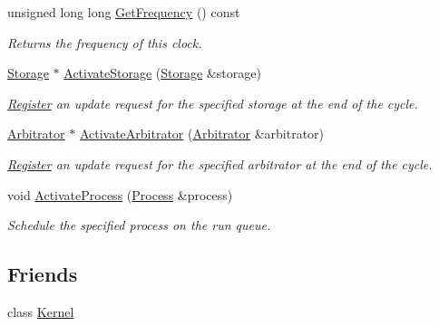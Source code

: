 \begin{DoxyCompactItemize}
unsigned long long \hyperlink{class_simulator_1_1_clock_a33bced1d6b21cfa1e13923ddb2213b07}{Get\+Frequency} () const 
\begin{DoxyCompactList}\small\item\em Returns the frequency of this clock. \end{DoxyCompactList}\item 
\hyperlink{class_simulator_1_1_storage}{Storage} $\ast$ \hyperlink{class_simulator_1_1_clock_af051b1730aa459c97e41ff514099d16f}{Activate\+Storage} (\hyperlink{class_simulator_1_1_storage}{Storage} \&storage)
\begin{DoxyCompactList}\small\item\em \hyperlink{class_simulator_1_1_register}{Register} an update request for the specified storage at the end of the cycle. \end{DoxyCompactList}\item 
\hyperlink{class_simulator_1_1_arbitrator}{Arbitrator} $\ast$ \hyperlink{class_simulator_1_1_clock_ad42357b1feaf31181126645c39c9afe0}{Activate\+Arbitrator} (\hyperlink{class_simulator_1_1_arbitrator}{Arbitrator} \&arbitrator)
\begin{DoxyCompactList}\small\item\em \hyperlink{class_simulator_1_1_register}{Register} an update request for the specified arbitrator at the end of the cycle. \end{DoxyCompactList}\item 
void \hyperlink{class_simulator_1_1_clock_a37e7934391b529a2155c4e2a08f4ee9b}{Activate\+Process} (\hyperlink{class_simulator_1_1_process}{Process} \&process)
\begin{DoxyCompactList}\small\item\em Schedule the specified process on the run queue. \end{DoxyCompactList}\end{DoxyCompactItemize}
\subsection*{Friends}
\begin{DoxyCompactItemize}
\item 
class \hyperlink{class_simulator_1_1_clock_a3807a3ebd0e05ca8cb4d928025a943d2}{Kernel}
\end{DoxyCompactItemize}


